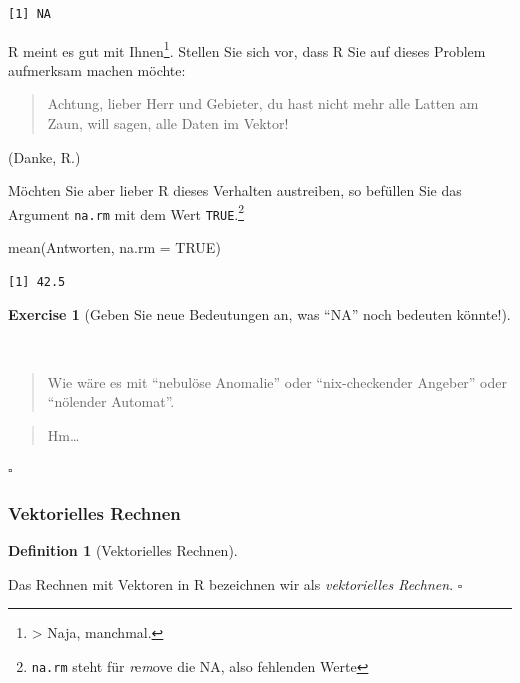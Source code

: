 \documentclass[
  letterpaper,
  DIV=11,
  numbers=noendperiod]{scrartcl}
\newenvironment{Shaded}{\begin{snugshade}}{\end{snugshade}}
\newcommand{\AttributeTok}[1]{\textcolor[rgb]{0.40,0.45,0.13}{#1}}
\newcommand{\ConstantTok}[1]{\textcolor[rgb]{0.56,0.35,0.01}{#1}}
\newcommand{\FunctionTok}[1]{\textcolor[rgb]{0.28,0.35,0.67}{#1}}
\newcommand{\NormalTok}[1]{\textcolor[rgb]{0.00,0.23,0.31}{#1}}
\theoremstyle{definition}
\newtheorem{exercise}{Exercise}[section]
\theoremstyle{definition}
\theoremstyle{definition}
\newtheorem{definition}{Definition}[section]
\theoremstyle{remark}
\begin{document}
\begin{verbatim}
[1] NA
\end{verbatim}

R meint es gut mit Ihnen\footnote{\textgreater{} Naja, manchmal.}.
Stellen Sie sich vor, dass R Sie auf dieses Problem aufmerksam machen
möchte:

\begin{quote}
Achtung, lieber Herr und Gebieter, du hast nicht mehr alle Latten am
Zaun, will sagen, alle Daten im Vektor!
\end{quote}

(Danke, R.)

Möchten Sie aber lieber R dieses Verhalten austreiben, so befüllen Sie
das Argument \texttt{na.rm} mit dem Wert \texttt{TRUE}.\footnote{\texttt{na.rm}
  steht für \emph{r}e\emph{m}ove die NA, also fehlenden Werte}

\begin{Shaded}
\begin{Highlighting}[]
\FunctionTok{mean}\NormalTok{(Antworten, }\AttributeTok{na.rm =} \ConstantTok{TRUE}\NormalTok{)}
\end{Highlighting}
\end{Shaded}

\begin{verbatim}
[1] 42.5
\end{verbatim}

\begin{exercise}[Geben Sie neue Bedeutungen an, was ``NA'' noch bedeuten
könnte!]\protect\hypertarget{exr-na}{}\label{exr-na}

~

\begin{quote}
Wie wäre es mit ``nebulöse Anomalie'' oder ``nix-checkender Angeber''
oder ``nölender Automat''.
\end{quote}

\begin{quote}
Hm\ldots{}
\end{quote}

\(\square\)

\end{exercise}

\subsubsection{Vektorielles Rechnen}\label{sec-veccalc}

\begin{definition}[Vektorielles
Rechnen]\protect\hypertarget{def-veccalc}{}\label{def-veccalc}

Das Rechnen mit Vektoren in R bezeichnen wir als \emph{vektorielles
Rechnen}. \(\square\)

\end{definition}
\end{document}
